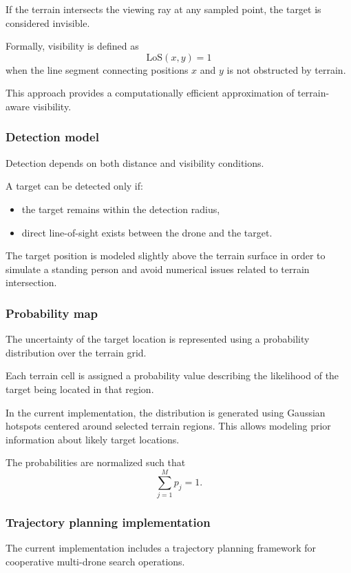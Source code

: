 \documentclass[english]{projectreport}
\begin{document}
If the terrain intersects the viewing ray at any sampled point, the target is considered invisible.

Formally, visibility is defined as
\[
\mathrm{LoS}(x,y)=1
\]
when the line segment connecting positions $x$ and $y$ is not obstructed by terrain.

This approach provides a computationally efficient approximation of terrain-aware visibility.

\subsubsection{Detection model}

Detection depends on both distance and visibility conditions.

A target can be detected only if:
\begin{itemize}
    \item the target remains within the detection radius,
    \item direct line-of-sight exists between the drone and the target.
\end{itemize}

The target position is modeled slightly above the terrain surface in order to simulate a standing person and avoid numerical issues related to terrain intersection.

\subsubsection{Probability map}

The uncertainty of the target location is represented using a probability distribution over the terrain grid.

Each terrain cell is assigned a probability value describing the likelihood of the target being located in that region.

In the current implementation, the distribution is generated using Gaussian hotspots centered around selected terrain regions. This allows modeling prior information about likely target locations.

The probabilities are normalized such that
\[
\sum_{j=1}^{M} p_j = 1.
\]

\subsubsection{Trajectory planning implementation}

The current implementation includes a trajectory planning framework for cooperative multi-drone search operations.
\end{document}
